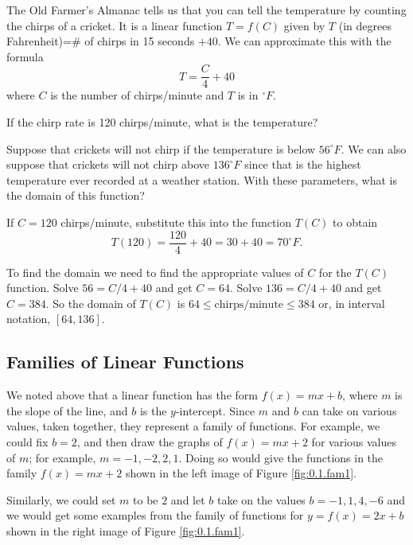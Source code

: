 


\bex
The Old Farmer's Almanac tells us that you can tell the temperature by counting the chirps
of a cricket.  It is a linear function $T=f(C)$ given by $T$ (in degrees Fahrenheit)=\# of
chirps in 15 seconds $+40$.  We can approximate this with the formula 
\[ T =  \frac{C}{4} + 40 \]
where $C$ is the number of chirps/minute and $T$ is in $^\circ F$.
\ba
    \item If the chirp rate is 120 chirps/minute, what is the temperature?
    \item Suppose that crickets will not chirp if the temperature is below $56^\circ F$.
        We can also suppose that crickets will not chirp above $136^\circ F$ since that is
        the highest temperature ever recorded at a weather station.  With these
        parameters, what is the domain of this function?
\ea
\eex
\ba
    \item If $C = 120$ chirps/minute, substitute this into the function $T(C)$ to obtain
        \[ T(120) = \frac{120}{4} + 40 = 30 + 40 = 70^\circ F. \]
    \item To find the domain we need to find the appropriate values of $C$ for the $T(C)$
        function.  Solve $56=C/4+40$ and get $C = 64$.  Solve $136=C/4+40$ and get $C =
        384$.  So the domain of $T(C)$ is $64 \le \text{chirps/minute} \le 384$ or, in
        interval notation, $[64, 136]$. 

\ea
\afterex


\subsection*{Families of Linear Functions}
We noted above that a linear function has the form  $f(x)=mx+b$, where $m$ is the slope of
the line, and $b$ is the $y$-intercept.  Since $m$ and $b$ can take on various values, taken
together, they represent a family of functions.  For example, we could fix $b = 2$, and then
draw the graphs of $f(x)=mx+2$ for various values of $m$; for example, $m = -1, -2, 2, 1$.
Doing so would give the functions in the family $f(x)=mx+2$ shown in the left image of Figure
\ref{fig:0.1.fam1}.

Similarly, we could set $m$ to be $2$ and let $b$ take on the values $b=-1, 1, 4, -6$ and
we would get
some examples from the family of functions for $y=f(x)=2x+b$ shown in the right image of Figure
\ref{fig:0.1.fam1}.


